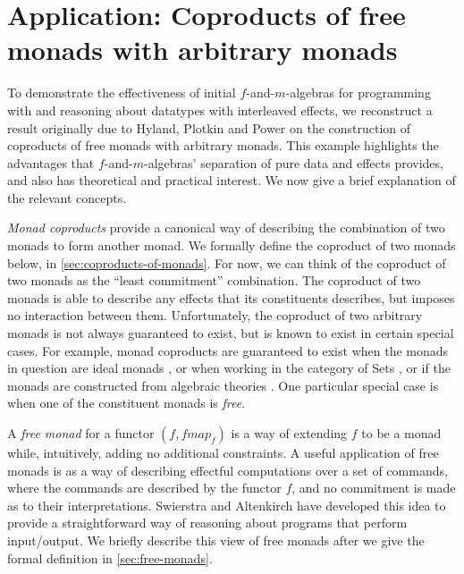 \documentclass{jfp1}
\begin{document}
\section{Application: Coproducts of free monads with arbitrary monads}
\label{sec:coproducts-with-free-monads}

To demonstrate the effectiveness of initial $f$-and-$m$-algebras for
programming with and reasoning about datatypes with interleaved
effects, we reconstruct a result originally due to Hyland, Plotkin and
Power \cite{hyland06combining} on the construction of coproducts of
free monads with arbitrary monads. This example highlights the
advantages that $f$-and-$m$-algebras' separation of pure data and
effects provides, and also has theoretical and practical interest. We
now give a brief explanation of the relevant concepts.

\emph{Monad coproducts} provide a canonical way of describing the
combination of two monads to form another monad. We formally define
the coproduct of two monads below, in
\autoref{sec:coproducts-of-monads}. For now, we can think of the
coproduct of two monads as the ``least commitment'' combination. The
coproduct of two monads is able to describe any effects that its
constituents describes, but imposes no interaction between
them. Unfortunately, the coproduct of two arbitrary monads is not
always guaranteed to exist, but is known to exist in certain special
cases. For example, monad coproducts are guaranteed to exist when the
monads in question are ideal monads \cite{ghani04coproducts}, or when
working in the category of Sets \cite{adamek12coproducts}, or if the
monads are constructed from algebraic theories
\cite{hyland06combining}. One particular special case is when one of
the constituent monads is \emph{free}.

A \emph{free monad} for a functor $(f, \mathit{fmap}_f)$ is a way of
extending $f$ to be a monad while, intuitively, adding no additional
constraints. A useful application of free monads is as a way of
describing effectful computations over a set of commands, where the
commands are described by the functor $f$, and no commitment is made
as to their interpretations. Swierstra and Altenkirch
\cite{swierstra07beauty} have developed this idea to provide a
straightforward way of reasoning about programs that perform
input/output. We briefly describe this view of free monads after we
give the formal definition in \autoref{sec:free-monads}.
\end{document}
